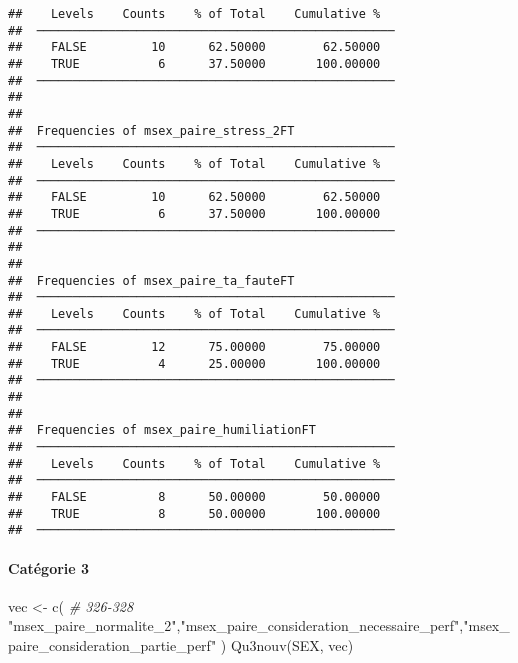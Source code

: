 \documentclass[
]{article}
\newenvironment{Shaded}{\begin{snugshade}}{\end{snugshade}}
\newcommand{\CommentTok}[1]{\textcolor[rgb]{0.56,0.35,0.01}{\textit{#1}}}
\newcommand{\FunctionTok}[1]{\textcolor[rgb]{0.00,0.00,0.00}{#1}}
\newcommand{\NormalTok}[1]{#1}
\newcommand{\OtherTok}[1]{\textcolor[rgb]{0.56,0.35,0.01}{#1}}
\newcommand{\StringTok}[1]{\textcolor[rgb]{0.31,0.60,0.02}{#1}}
\begin{document}
\begin{verbatim}
##    Levels    Counts    % of Total    Cumulative %   
##  ────────────────────────────────────────────────── 
##    FALSE         10      62.50000        62.50000   
##    TRUE           6      37.50000       100.00000   
##  ────────────────────────────────────────────────── 
## 
## 
##  Frequencies of msex_paire_stress_2FT               
##  ────────────────────────────────────────────────── 
##    Levels    Counts    % of Total    Cumulative %   
##  ────────────────────────────────────────────────── 
##    FALSE         10      62.50000        62.50000   
##    TRUE           6      37.50000       100.00000   
##  ────────────────────────────────────────────────── 
## 
## 
##  Frequencies of msex_paire_ta_fauteFT               
##  ────────────────────────────────────────────────── 
##    Levels    Counts    % of Total    Cumulative %   
##  ────────────────────────────────────────────────── 
##    FALSE         12      75.00000        75.00000   
##    TRUE           4      25.00000       100.00000   
##  ────────────────────────────────────────────────── 
## 
## 
##  Frequencies of msex_paire_humiliationFT            
##  ────────────────────────────────────────────────── 
##    Levels    Counts    % of Total    Cumulative %   
##  ────────────────────────────────────────────────── 
##    FALSE          8      50.00000        50.00000   
##    TRUE           8      50.00000       100.00000   
##  ──────────────────────────────────────────────────
\end{verbatim}

\hypertarget{catuxe9gorie-3-3}{%
\paragraph{Catégorie 3}\label{catuxe9gorie-3-3}}

\begin{Shaded}
\begin{Highlighting}[]
\NormalTok{vec }\OtherTok{\textless{}{-}} \FunctionTok{c}\NormalTok{(   }\CommentTok{\# 326{-}328}
  \StringTok{"msex\_paire\_normalite\_2"}\NormalTok{,}\StringTok{"msex\_paire\_consideration\_necessaire\_perf"}\NormalTok{,}\StringTok{"msex\_paire\_consideration\_partie\_perf"}
\NormalTok{)}
\FunctionTok{Qu3nouv}\NormalTok{(SEX, vec)}
\end{Highlighting}
\end{Shaded}
\end{document}
